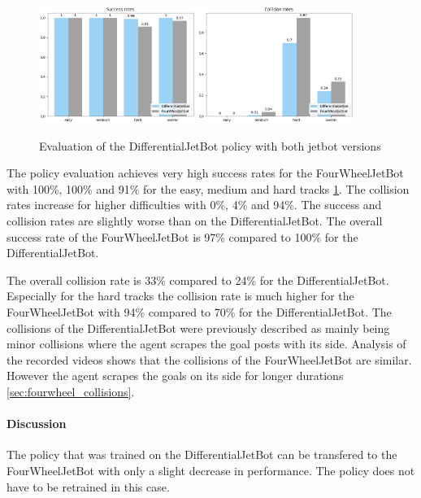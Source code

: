 \begin{figure}
    \centering
    \includegraphics[width=0.45\textwidth]{Bilder/notebook_images/hardDistanceMixedLight_eval_jetbot_generalization_success_rates_barplot.png}
    \includegraphics[width=0.45\textwidth]{Bilder/notebook_images/hardDistanceMixedLight_eval_jetbot_generalization_collision_rates_barplot.png}
    \caption{Evaluation of the DifferentialJetBot policy with both jetbot versions}
    \label{fig:result_jetbot_generalization}
\end{figure} %

The policy evaluation achieves very high success rates for the FourWheelJetBot with 100\%, 100\% and 91\% for the easy, medium and hard tracks \ref{fig:result_jetbot_generalization}. The collision rates increase for higher difficulties with 0\%, 4\% and 94\%. 
The success and collision rates are slightly worse than on the DifferentialJetBot. The overall success rate of the FourWheelJetBot is 97\% compared to 100\% for the DifferentialJetBot. 

The overall collision rate is 33\% compared to 24\% for the DifferentialJetBot. Especially for the hard tracks the collision rate is much higher for the FourWheelJetBot with 94\% compared to 70\% for the DifferentialJetBot.
The collisions of the DifferentialJetBot were previously described as mainly being minor collisions where the agent scrapes the goal posts with its side. Analysis of the recorded videos shows that the collisions of the FourWheelJetBot are similar. However the agent scrapes the goals on its side for longer durations \ref{sec:fourwheel_collisions}.


\paragraph{Discussion}

The policy that was trained on the DifferentialJetBot can be transfered to the FourWheelJetBot with only a slight decrease in performance.
The policy does not have to be retrained in this case. 

